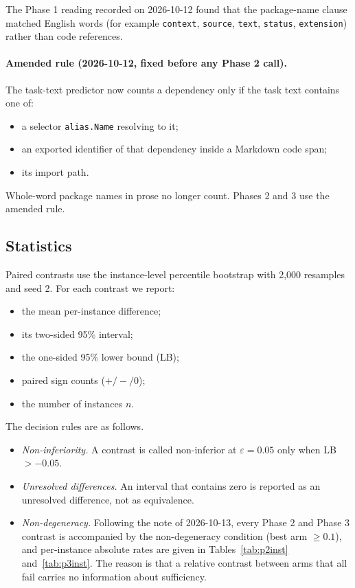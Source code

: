\documentclass[10pt]{article}
\newcommand{\eps}{\varepsilon}
\begin{document}
The Phase 1 reading recorded on 2026-10-12 found that the package-name clause matched English words (for example \texttt{context}, \texttt{source}, \texttt{text}, \texttt{status}, \texttt{extension}) rather than code references.

\paragraph{Amended rule (2026-10-12, fixed before any Phase 2 call).} The task-text predictor now counts a dependency only if the task text contains one of:
\begin{itemize}
\item a selector \texttt{alias.Name} resolving to it;
\item an exported identifier of that dependency inside a Markdown code span;
\item its import path.
\end{itemize}
Whole-word package names in prose no longer count. Phases 2 and 3 use the amended rule.

\subsection{Statistics}

Paired contrasts use the instance-level percentile bootstrap with 2,000 resamples and seed 2. For each contrast we report:
\begin{itemize}
\item the mean per-instance difference;
\item its two-sided 95\% interval;
\item the one-sided 95\% lower bound (LB);
\item paired sign counts ($+/-/0$);
\item the number of instances $n$.
\end{itemize}

The decision rules are as follows.
\begin{itemize}
\item \emph{Non-inferiority.} A contrast is called non-inferior at $\eps = 0.05$ only when LB $> -0.05$.
\item \emph{Unresolved differences.} An interval that contains zero is reported as an unresolved difference, not as equivalence.
\item \emph{Non-degeneracy.} Following the note of 2026-10-13, every Phase 2 and Phase 3 contrast is accompanied by the non-degeneracy condition (best arm $\geq 0.1$), and per-instance absolute rates are given in Tables~\ref{tab:p2inst} and~\ref{tab:p3inst}. The reason is that a relative contrast between arms that all fail carries no information about sufficiency.
\end{itemize}
\end{document}
